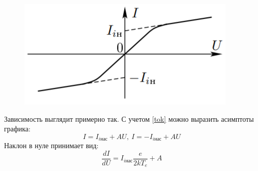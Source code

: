 \documentclass[a4paper, 10pt]{article}
\begin{document}
        \begin{figure}[h!]
                \includegraphics[scale=0.8]{4.png}
        \end{figure}
        Зависимость выглядит примерно так.
        С учетом \ref{tok} можно выразить асимптоты графика:
        \begin{equation}
                I = I_{i\text{нас}} + AU,\ I = -I_{i\text{нас}} + AU
        \end{equation}
        Наклон в нуле принимает вид:
        \begin{equation}
          \frac{dI}{dU} = I_{i\text{нас}} \frac{e}{2kT_e} + A
        \end{equation}
\end{document}
